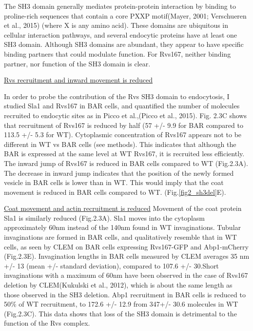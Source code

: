 	\vspace{5mm}
The SH3 domain generally mediates protein-protein interaction by binding to proline-rich sequences that contain a core PXXP motif(Mayer, 2001; Verschueren et al., 2015) (where X is any amino acid). These domains are ubiquitous in cellular interaction pathways, and several endocytic proteins have at least one SH3 domain. Although SH3 domains are abundant, they appear to have specific binding partners that could modulate function. For Rvs167, neither binding partner, nor function of the SH3 domain is clear. 


	\vspace{5mm}
\underline{Rvs recruitment and inward movement is reduced}

In order to probe the contribution of the Rvs SH3 domain to endocytosis, I studied Sla1 and Rvs167 in BAR cells, and quantified the number of molecules recruited to endocytic sites as in Picco et al.,(Picco et al., 2015). Fig. 2.3C shows that recruitment of Rvs167 is reduced by half (57 +/- 9.9 for BAR compared to 113.5 +/- 5.3 for WT). Cytoplasmic concentration of Rvs167 appears not to be different in WT vs BAR cells (see methods). This indicates that although the BAR is expressed at the same level at WT Rvs167, it is recruited less efficiently. 
The inward jump of Rvs167 is reduced in BAR cells compared to WT (Fig.2.3A). The decrease in inward jump indicates that the position of the newly formed vesicle in BAR cells is lower than in WT. This would imply that the coat movement is reduced in BAR cells compared to WT.
 (Fig.\ref{fig2_sh3del}E). 

	\vspace{5mm}
	\underline{Coat movement and actin recruitment is reduced}
Movement of the coat protein Sla1 is similarly reduced (Fig.2.3A). Sla1 moves into the cytoplasm approximately 60nm instead of the 140nm found in WT invaginations. Tubular invaginations are formed in BAR cells, and qualitatively resemble that in WT cells, as seen by CLEM on BAR cells expressing Rvs167-GFP and Abp1-mCherry (Fig.2.3E). Invagination lengths in BAR cells measured by CLEM averages 35 nm +/- 13 (mean +/- standard deviation), compared to 107.6 +/- 30.Short invaginations with a maximum of 60nm have been observed in the case of Rvs167 deletion by CLEM(Kukulski et al., 2012), which is about the same length as those observed in the SH3 deletion. 
Abp1 recruitment in BAR cells is reduced to 50\% of WT recruitment, to 172.6 +/- 12.9 from 347+/- 30.6 molecules in WT (Fig.2.3C). This data shows that loss of the SH3 domain is detrimental to the function of the Rvs complex. 


